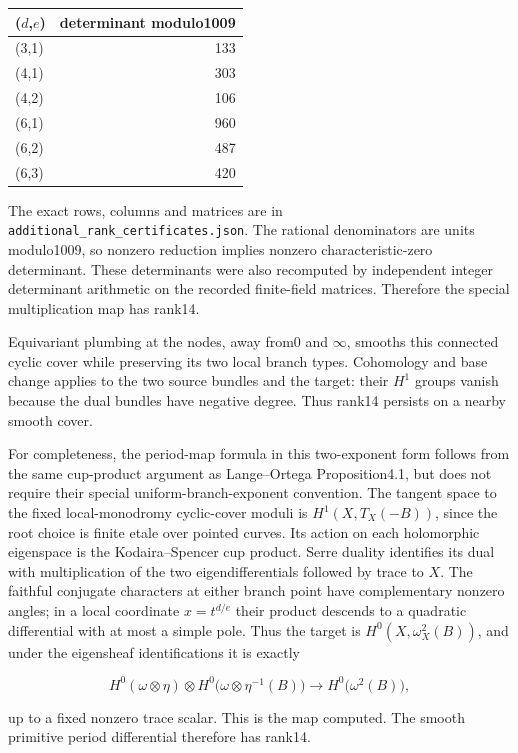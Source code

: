 \begin{center}
\begin{tabular}{lr}
\hline
(\(d\),\(e\)) & determinant modulo1009 \\
\hline
(3,1) & 133 \\
(4,1) & 303 \\
(4,2) & 106 \\
(6,1) & 960 \\
(6,2) & 487 \\
(6,3) & 420 \\
\hline
\end{tabular}
\end{center}

The exact rows, columns and matrices are in \texttt{additional\_rank\_certificates.json}. The rational denominators are units modulo1009, so nonzero reduction implies nonzero characteristic-zero determinant. These determinants were also recomputed by independent integer determinant arithmetic on the recorded finite-field matrices. Therefore the special multiplication map has rank14.

Equivariant plumbing at the nodes, away from0 and \(\infty\), smooths this connected cyclic cover while preserving its two local branch types. Cohomology and base change applies to the two source bundles and the target: their \(H^1\) groups vanish because the dual bundles have negative degree. Thus rank14 persists on a nearby smooth cover.

For completeness, the period-map formula in this two-exponent form follows from the same cup-product argument as Lange--Ortega Proposition4.1, but does not require their special uniform-branch-exponent convention. The tangent space to the fixed local-monodromy cyclic-cover moduli is \(H^1(X,T_X(-B))\), since the root choice is finite etale over pointed curves. Its action on each holomorphic eigenspace is the Kodaira--Spencer cup product. Serre duality identifies its dual with multiplication of the two eigendifferentials followed by trace to \(X\). The faithful conjugate characters at either branch point have complementary nonzero angles; in a local coordinate \(x=t^{d/e}\) their product descends to a quadratic differential with at most a simple pole. Thus the target is \(H^0(X,\omega_X^2(B))\), and under the eigensheaf identifications it is exactly \cite{IM-LangeOrtega}

\[
H^0(\omega\otimes\eta)\otimes H^0\bigl(\omega\otimes\eta^{-1}(B)\bigr)\longrightarrow H^0\bigl(\omega^2(B)\bigr),
\]

up to a fixed nonzero trace scalar. This is the map computed. The smooth primitive period differential therefore has rank14.

